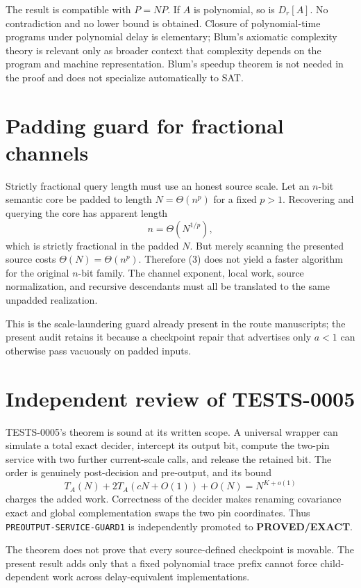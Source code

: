 \documentclass[11pt]{article}
\newcommand{\EXACT}{\textbf{PROVED/EXACT}}
\begin{document}
The result is compatible with $P=NP$.  If $A$ is polynomial, so is $D_r[A]$.
No contradiction and no lower bound is obtained.  Closure of polynomial-time
programs under polynomial delay is elementary; Blum's axiomatic complexity
theory is relevant only as broader context that complexity depends on the
program and machine representation.  Blum's speedup theorem is not needed in
the proof and does not specialize automatically to SAT.

\section{Padding guard for fractional channels}

Strictly fractional query length must use an honest source scale.  Let an
$n$-bit semantic core be padded to length $N=\Theta(n^p)$ for a fixed $p>1$.
Recovering and querying the core has apparent length
\[
 n=\Theta(N^{1/p}),                                      \tag{3}
\]
which is strictly fractional in the padded $N$.  But merely scanning the
presented source costs $\Theta(N)=\Theta(n^p)$.  Therefore (3) does not yield
a faster algorithm for the original $n$-bit family.  The channel exponent,
local work, source normalization, and recursive descendants must all be
translated to the same unpadded realization.

This is the scale-laundering guard already present in the route manuscripts;
the present audit retains it because a checkpoint repair that advertises only
$a<1$ can otherwise pass vacuously on padded inputs.

\section{Independent review of TESTS-0005}

TESTS-0005's theorem is sound at its written scope.  A universal wrapper can
simulate a total exact decider, intercept its output bit, compute the two-pin
service with two further current-scale calls, and release the retained bit.
The order is genuinely post-decision and pre-output, and its bound
\[
 T_A(N)+2T_A(cN+O(1))+O(N)=N^{K+o(1)}
\]
charges the added work.  Correctness of the decider makes renaming covariance
exact and global complementation swaps the two pin coordinates.  Thus
\texttt{PREOUTPUT-SERVICE-GUARD1} is independently promoted to \EXACT.

The theorem does not prove that every source-defined checkpoint is movable.
The present result adds only that a fixed polynomial trace prefix cannot force
child-dependent work across delay-equivalent implementations.
\end{document}
